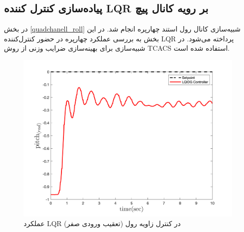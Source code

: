 \subsection{پیاده‌سازی کنترل کننده LQR بر رویه کانال پیچ}
در بخش
\ref{quadchanell_roll}
شبیه‌سازی کانال رول استند چهارپره انجام شد. در این بخش به بررسی عملکرد چهارپره در حضور کنترل‌کننده LQR پرداخته می‌شود. در شبیه‌سازی برای بهینه‌سازی ضرایب وزنی از روش
TCACS \cite{Karimi2010}
استفاده شده است.
\begin{figure}[H]\label{lqr_roll_fig}
	\includegraphics[width=.6\linewidth]{../Figures/Calibration/LQR/Pitch/lqr_pitch.png}
	\centering
	\caption{عملكرد LQR در کنترل زاويه رول (تعقیب ورودی صفر)}
\end{figure}
%
